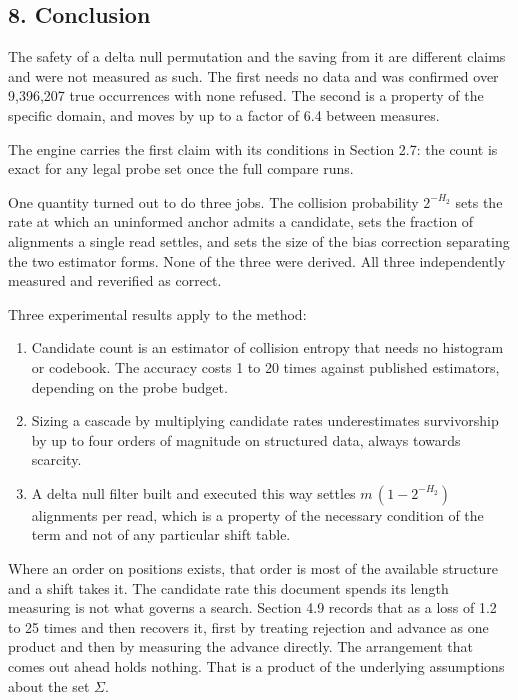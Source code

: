 \subsection{8. Conclusion}

The safety of a delta null permutation and the saving from it are different claims and were not
measured as such. The first needs no data and was confirmed over 9,396,207 true occurrences with
none refused. The second is a property of the specific domain, and moves by up to a factor of 6.4
between measures.

The engine carries the first claim with its conditions in Section 2.7: the count is exact for any
legal probe set once the full compare runs.

One quantity turned out to do three jobs. The collision probability \(2^{-H_2}\) sets the rate at
which an uninformed anchor admits a candidate, sets the fraction of alignments a single read
settles, and sets the size of the bias correction separating the two estimator forms. None of the
three were derived. All three independently measured and reverified as correct.

Three experimental results apply to the method:

\begin{enumerate}
  \item Candidate count is an estimator of collision entropy that needs no histogram or codebook.
    The accuracy costs 1 to 20 times against published estimators, depending on the probe budget.
  \item Sizing a cascade by multiplying candidate rates underestimates survivorship by up to four
    orders of magnitude on structured data, always towards scarcity.
  \item A delta null filter built and executed this way settles \(m\,(1 - 2^{-H_2})\) alignments
    per read, which is a property of the necessary condition of the term and not of any particular
    shift table.
\end{enumerate}

Where an order on positions exists, that order is most of the available structure and a shift takes it. The candidate rate this document spends its length measuring is not what governs a search. Section 4.9 records that as a loss of 1.2 to 25 times and then recovers it, first by treating rejection and advance as one product and then by measuring the advance directly. The arrangement that comes out ahead holds nothing. That is a product of the underlying assumptions about the set \(\Sigma\).

